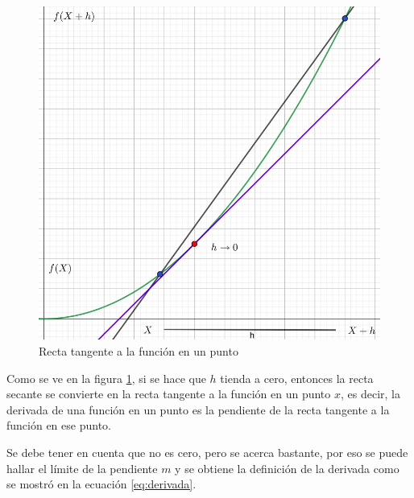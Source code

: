 \begin{figure}[H]
    \centering
    \includegraphics[scale=0.3]{images/geogebra/derivadaDef2.jpeg}
    \caption{Recta tangente a la función en un punto}
    \label{fig:def_derivada}
\end{figure}

Como se ve en la figura \ref{fig:def_derivada}, si se hace que $h$ tienda a cero, entonces la recta secante se convierte en la recta tangente a la función en un punto $x$, es decir, la derivada de una función en un punto es la pendiente de la recta tangente a la función en ese punto.

Se debe tener en cuenta que no es cero, pero se acerca bastante, por eso se puede hallar el límite de la pendiente $m$ y se obtiene la definición de la derivada como se mostró en la ecuación \ref{eq:derivada}.